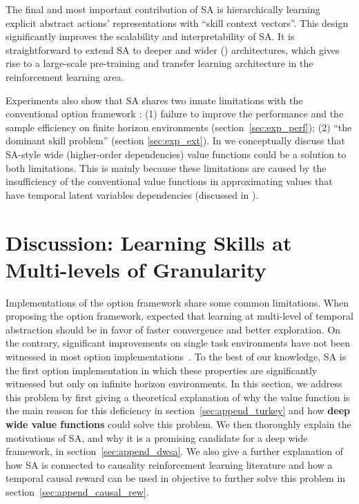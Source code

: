 The final and most important contribution of SA is hierarchically
learning explicit abstract actions' representations with ``skill
context vectors''. This design significantly improves the
scalability and interpretability of SA. It is straightforward to
extend SA to deeper and wider ()
architectures, which gives rise to a large-scale pre-training and
transfer learning architecture in the reinforcement learning
area.

Experiments also show that SA shares two innate limitations with
the conventional option framework
\cite{levy2011unified,klissarov2017learnings,smith2018inference,harb2018waiting,zhang2019dac}:
(1) failure to improve the performance and the sample efficiency
on finite horizon environments (section~\ref{sec:exp_perf}); (2)
``the dominant skill problem'' \cite{zhang2019dac} (section
\ref{sec:exp_ext}). In  we
conceptually discuss that SA-style wide (higher-order
dependencies) value functions could be a solution to both
limitations. This is mainly because these limitations are caused
by the insufficiency of the conventional value functions in
approximating values that have temporal latent variables
dependencies (discussed in ).


\section{Discussion: Learning Skills at Multi-levels of
  Granularity}
\label{sec:append_gist}

Implementations of the option framework share some common
limitations. When proposing the option framework,
 expected that learning at
multi-level of temporal abstraction should be in favor of faster
convergence and better exploration. On the contrary, significant
improvements on single task environments have not been witnessed
in most option
implementations~\cite{klissarov2017learnings,smith2018inference,harb2018waiting,zhang2019dac}.
To the best of our knowledge, SA is the first option
implementation in which these properties are significantly
witnessed but only on infinite horizon environments. In this
section, we address this problem by first giving a theoretical
explanation of why the value function is the main reason for this
deficiency in section~\ref{sec:append_turkey} and how
\textbf{deep wide value functions} could solve this problem. We
then thoroughly explain the motivations of SA, and why it is a
promising candidate for a deep wide framework, in
section~\ref{sec:append_dwsa}. We also give a further explanation
of how SA is connected to causality reinforcement learning
literature and how a temporal causal reward can be used in
objective to further solve this problem in
section~\ref{sec:append_causal_rew}.

